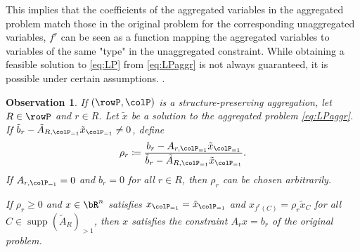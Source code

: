 \documentclass[smallextended,natbib]{svjour3}       %
\newcommand{\gr}[2][]{\todo[color=violet!40!,#1]{\textsf{GR:} #2}}
\newtheorem{observation}[theorem]{Observation}
\DeclareMathOperator{\supp}{supp}
\numberwithin{theorem}{section}
\begin{document}
\vspace{0.5cm}
This implies that the coefficients of the aggregated variables in the aggregated problem match those
 in the original problem for the corresponding unaggregated variables, \(f^r\) can be seen as a 
 function mapping the aggregated variables to variables of the same "type" in the unaggregated
  constraint.
 While obtaining a feasible solution to \eqref{eq:LP} from \eqref{eq:LPaggr} is not always guaranteed,
  it is possible under certain assumptions.
.
\begin{observation}
\label{ob:aggrconstr}
If \((\rowP, \colP)\) is a structure-preserving aggregation, let \(R \in \rowP\) and \(r \in R\). Let \(\tilde{x}\) be a solution
 to the aggregated problem \eqref{eq:LPaggr}. 
If \(\tilde{b}_r - \tilde{A}_{R, \colP_{=1}} \tilde{x}_{\colP_{=1}} \neq 0\), define 
\[\rho_r \coloneqq \frac{b_r - A_{r, \colP_{=1}} \tilde{x}_{\colP_{=1}}}{\tilde{b}_r
 - \tilde{A}_{R, \colP_{=1}} \tilde{x}_{\colP_{=1}}}.\]
  If \(A_{r, \colP_{=1}} = 0\) and \(b_r = 0\) for all \(r \in R\), then \(\rho_r\) can be chosen arbitrarily. 

If \(\rho_r \geq 0\) and \(x \in \bR^n\) satisfies \(x_{\colP_{=1}} = \tilde{x}_{\colP_{=1}}\) and \(x_{f^r(C)} = \rho_r \tilde{x}_C\) for all \(C \in \supp(\tilde{A}_R)_{>1}\), then \(x\) satisfies the constraint \(A_r x = b_r\) of the original problem.
\end{observation}
\end{document}
